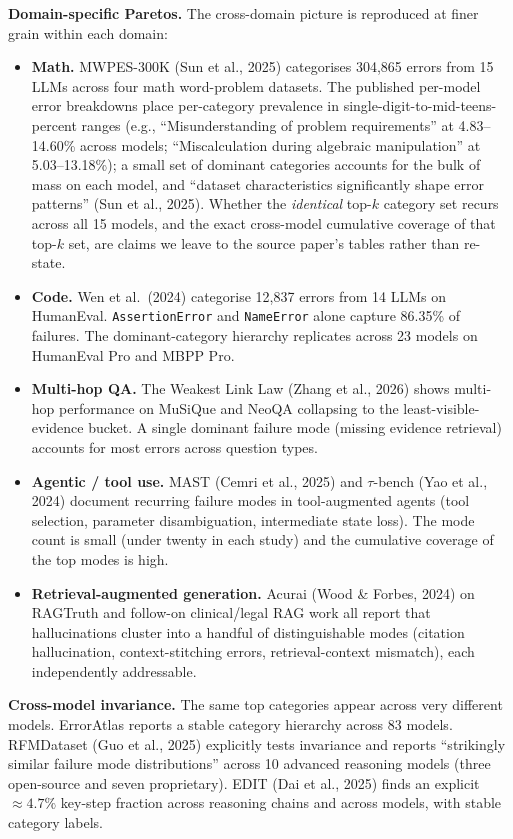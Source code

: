 \documentclass[
]{article}
\providecommand{\tightlist}{%
  \setlength{\itemsep}{0pt}\setlength{\parskip}{0pt}}
\begin{document}
\textbf{Domain-specific Paretos.} The cross-domain picture is reproduced
at finer grain within each domain:

\begin{itemize}
\tightlist
\item
  \textbf{Math.} MWPES-300K (Sun et al., 2025) categorises 304,865
  errors from 15 LLMs across four math word-problem datasets. The
  published per-model error breakdowns place per-category prevalence in
  single-digit-to-mid-teens-percent ranges (e.g., ``Misunderstanding of
  problem requirements'' at 4.83--14.60\% across models;
  ``Miscalculation during algebraic manipulation'' at 5.03--13.18\%); a
  small set of dominant categories accounts for the bulk of mass on each
  model, and ``dataset characteristics significantly shape error
  patterns'' (Sun et al., 2025). Whether the \emph{identical} top-\(k\)
  category set recurs across all 15 models, and the exact cross-model
  cumulative coverage of that top-\(k\) set, are claims we leave to the
  source paper's tables rather than re-state.
\item
  \textbf{Code.} Wen et al.~(2024) categorise 12,837 errors from 14 LLMs
  on HumanEval. \texttt{AssertionError} and \texttt{NameError} alone
  capture 86.35\% of failures. The dominant-category hierarchy
  replicates across 23 models on HumanEval Pro and MBPP Pro.
\item
  \textbf{Multi-hop QA.} The Weakest Link Law (Zhang et al., 2026) shows
  multi-hop performance on MuSiQue and NeoQA collapsing to the
  least-visible-evidence bucket. A single dominant failure mode (missing
  evidence retrieval) accounts for most errors across question types.
\item
  \textbf{Agentic / tool use.} MAST (Cemri et al., 2025) and
  \(\tau\)-bench (Yao et al., 2024) document recurring failure modes in
  tool-augmented agents (tool selection, parameter disambiguation,
  intermediate state loss). The mode count is small (under twenty in
  each study) and the cumulative coverage of the top modes is high.
\item
  \textbf{Retrieval-augmented generation.} Acurai (Wood \& Forbes, 2024)
  on RAGTruth and follow-on clinical/legal RAG work all report that
  hallucinations cluster into a handful of distinguishable modes
  (citation hallucination, context-stitching errors, retrieval-context
  mismatch), each independently addressable.
\end{itemize}

\textbf{Cross-model invariance.} The same top categories appear across
very different models. ErrorAtlas reports a stable category hierarchy
across 83 models. RFMDataset (Guo et al., 2025) explicitly tests
invariance and reports ``strikingly similar failure mode distributions''
across 10 advanced reasoning models (three open-source and seven
proprietary). EDIT (Dai et al., 2025) finds an explicit
\(\approx 4.7\%\) key-step fraction across reasoning chains and across
models, with stable category labels.
\end{document}
